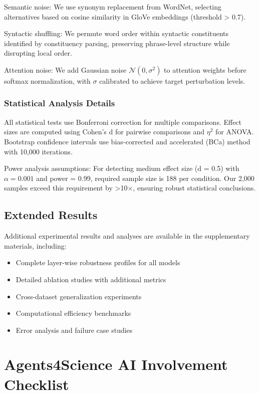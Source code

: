 \documentclass{article}
\begin{document}
Semantic noise: We use synonym replacement from WordNet, selecting alternatives based on cosine similarity in GloVe embeddings (threshold > 0.7).

Syntactic shuffling: We permute word order within syntactic constituents identified by constituency parsing, preserving phrase-level structure while disrupting local order.

Attention noise: We add Gaussian noise $\mathcal{N}(0, \sigma^2)$ to attention weights before softmax normalization, with $\sigma$ calibrated to achieve target perturbation levels.

\subsubsection{Statistical Analysis Details}

All statistical tests use Bonferroni correction for multiple comparisons. Effect sizes are computed using Cohen's d for pairwise comparisons and $\eta^2$ for ANOVA. Bootstrap confidence intervals use bias-corrected and accelerated (BCa) method with 10,000 iterations.

Power analysis assumptions: For detecting medium effect size (d = 0.5) with $\alpha = 0.001$ and power = 0.99, required sample size is 188 per condition. Our 2,000 samples exceed this requirement by >10×, ensuring robust statistical conclusions.

\subsection{Extended Results}

Additional experimental results and analyses are available in the supplementary materials, including:
\begin{itemize}
\item Complete layer-wise robustness profiles for all models
\item Detailed ablation studies with additional metrics
\item Cross-dataset generalization experiments
\item Computational efficiency benchmarks
\item Error analysis and failure case studies
\end{itemize}

\newpage

\section*{Agents4Science AI Involvement Checklist}
\end{document}
